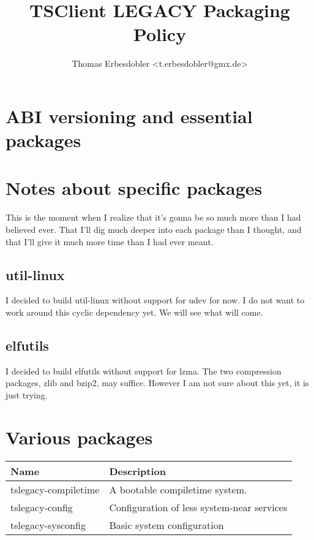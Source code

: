 \documentclass[a4paper]{article}
\title{TSClient LEGACY Packaging Policy}
\author{Thomas Erbesdobler \textless t.erbesdobler@gmx.de\textgreater}
\begin{document}
	\maketitle
	\tableofcontents

	\section{ABI versioning and essential packages}
	
	\section{Notes about specific packages}
	
	This is the moment when I realize that it's gonna be so much more than I had believed ever. That I'll dig much deeper into each package than I thought, and that I'll give it much more time than I had ever meant.
	
	\subsection{util-linux}
	
	I decided to build util-linux without support for udev for now. I do not want to work around this cyclic dependency yet. We will see what will come.
	
	\subsection{elfutils}
	
	I decided to build elfutils without support for lzma. The two compression packages, zlib and bzip2, may suffice. However I am not sure about this yet, it is just trying.
	
	\section{Various packages}
	
	\begin{tabularx}{\textwidth}{l|X}
		Name & Description \\
		\hline
		tslegacy-compiletime & A bootable compiletime system. \\
		tslegacy-config & Configuration of less system-near services \\
		tslegacy-sysconfig & Basic system configuration \\
	\end{tabularx}
\end{document}
